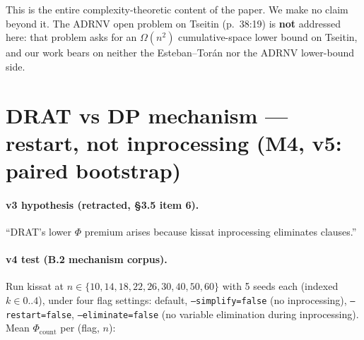 \documentclass[11pt,a4paper]{article}
\theoremstyle{remark}
\begin{document}
{This is the entire complexity-theoretic content of the paper. We make no
claim beyond it. The ADRNV open problem on Tseitin (p.~38:19) is
\textbf{not} addressed here: that problem asks for an $\Omega(n^2)$
cumulative-space lower bound on Tseitin, and our work bears on neither
the Esteban--Tor\'an nor the ADRNV lower-bound side.

\clearpage
\section{DRAT vs DP mechanism --- restart, not inprocessing (M4, v5: paired bootstrap)}

\paragraph{v3 hypothesis (retracted, \S3.5 item 6).} ``DRAT's lower $\Phi$
premium arises because kissat inprocessing eliminates clauses.''

\paragraph{v4 test (B.2 mechanism corpus).} Run kissat at $n \in \{10,
14, 18, 22, 26, 30, 40, 50, 60\}$ with 5 seeds each (indexed $k \in
0..4$), under four flag settings: default, \texttt{--simplify=false} (no
inprocessing), \texttt{--restart=false}, \texttt{--eliminate=false} (no
variable elimination during inprocessing). Mean $\Phi_{\mathrm{count}}$
per (flag, $n$):

}
\end{document}
